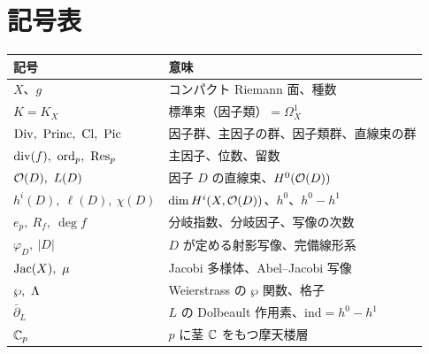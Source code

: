 \section*{記号表}
\begin{longtable}{p{}p{}}
\toprule
記号 & 意味\\
\midrule
$X$、$g$ & コンパクト Riemann 面、種数\\
$K=K_X$ & 標準束（因子類）$=\Omega^1_X$\\
$\Div,\ \mathrm{Princ},\ \mathrm{Cl},\ \Pic$ & 因子群、主因子の群、因子類群、直線束の群\\
$\divv(f),\ \ord_p,\ \Res_p$ & 主因子、位数、留数\\
$\Oc(D),\ L(D)$ & 因子 $D$ の直線束、$H^0(\mathcal O(D))$\\
$h^i(D),\ \ell(D),\ \chi(D)$ & $\dim H^i(X,\mathcal O(D))$、$h^0$、$h^0-h^1$\\
$e_p,\ R_f,\ \deg f$ & 分岐指数、分岐因子、写像の次数\\
$\varphi_D,\ |D|$ & $D$ が定める射影写像、完備線形系\\
$\Jac(X),\ \mu$ & Jacobi 多様体、Abel--Jacobi 写像\\
$\wp,\ \Lat$ & Weierstrass の $\wp$ 関数、格子\\
$\bar\partial_L$ & $L$ の Dolbeault 作用素、$\mathrm{ind}=h^0-h^1$\\
$\mathbb C_p$ & $p$ に茎 $\mathbb C$ をもつ摩天楼層\\
\bottomrule
\end{longtable}

